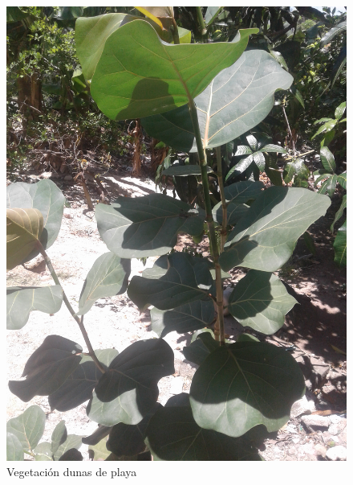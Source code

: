 \documentclass[11pt,]{article}
\begin{document}
\begin{figure}
\centering
\includegraphics{coccoloba_uvifera.jpg}
\caption{Vegetación dunas de playa\label{coccoloba}}
\end{figure}
\end{document}
